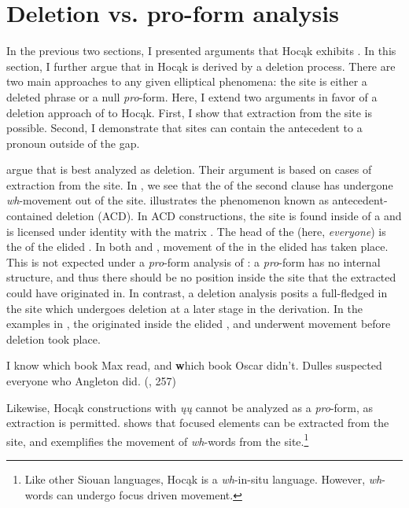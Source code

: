 \documentclass[output=paper]{LSP/langsci}
\begin{document}
\section{Deletion vs. pro-form analysis}\label{sec:johnson:4}

In the previous two sections, I presented arguments that Hocąk exhibits . In this section, I further argue that  in Hocąk is derived by a deletion process. There are two main approaches to any given elliptical phenomena: the  site is either a deleted phrase or a null \emph{pro}-form. Here, I extend two arguments in favor of a deletion approach of   to Hocąk. First, I show that extraction from the  site is possible. Second, I demonstrate that  sites can contain the antecedent to a pronoun outside of the gap.

\citet{FiengoMay1994} argue that   is best analyzed as  deletion. Their argument is based on cases of  extraction from the  site. In , we see that the  of the second clause has undergone \emph{wh}-movement out of the  site.  illustrates the phenomenon known as antecedent-contained deletion (ACD). In ACD constructions, the  site is found inside of a  and is licensed under identity with the matrix . The head of the  (here, \emph{everyone}) is the  of the elided . In both  and , movement of the  in the elided  has taken place. This is not expected under a \emph{pro}-form analysis of : a \emph{pro}-form has no internal structure, and thus there should be no  position inside the  site that the extracted  could have originated in. In contrast, a deletion analysis posits a full-fledged  in the  site which undergoes deletion at a later stage in the derivation. In the examples in , the  originated inside the elided , and underwent movement before deletion took place.
 
\ea\label{ex:johnson:46}
\ea\label{ex:johnson:46a}
I know which book Max read, and {\textbf which book} Oscar didn't.
\ex\label{ex:johnson:46b} 
Dulles suspected everyone who Angleton did. (\citealt[229]{FiengoMay1994}, 257)
\z
\z

Likewise, Hocąk constructions with \emph{ųų} cannot be analyzed as a \emph{pro}-form, as  extraction is permitted.  shows that focused elements can be extracted from the  site, and  exemplifies the movement of \emph{wh}-words from the  site.\footnote{Like other Siouan languages, Hocąk is a \emph{wh}-in-situ language. However, \emph{wh}-words can undergo focus driven movement.}
 
\end{document}
